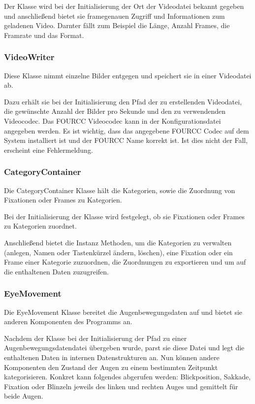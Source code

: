 \documentclass[a4paper,draft]{scrartcl}
\begin{document}
Der Klasse wird bei der Initialisierung der Ort der Videodatei bekannt gegeben und anschließend bietet sie framegenauen Zugriff und Informationen zum geladenen Video. Darnter fällt zum Beispiel die Länge, Anzahl Frames, die Framrate und das Format.

\subsubsection{VideoWriter}
Diese Klasse nimmt einzelne Bilder entgegen und speichert sie in einer Videodatei ab.

Dazu erhält sie bei der Initialisierung den Pfad der zu erstellenden Videodatei, die gewünschte Anzahl der Bilder pro Sekunde und den zu verwendenden Videocodec.
Das FOURCC Videocodec kann in der Konfigurationsdatei angegeben werden. Es ist wichtig, dass das angegebene FOURCC Codec auf dem System installiert ist und der FOURCC Name korrekt ist. Ist dies nicht der Fall, erscheint eine Fehlermeldung.

\subsubsection{CategoryContainer}
Die CategoryContainer Klasse hält die Kategorien, sowie die Zuordnung von Fixationen oder Frames zu Kategorien.

Bei der Initialisierung der Klasse wird festgelegt, ob sie Fixationen oder Frames zu Kategorien zuordnet.

Anschließend bietet die Instanz Methoden, um die Kategorien zu verwalten (anlegen, Namen oder Tastenkürzel ändern, löschen), eine Fixation oder ein Frame einer Kategorie zuzuordnen, die Zuordnungen zu exportieren und um auf die enthaltenen Daten zuzugreifen.

\subsubsection{EyeMovement}
Die EyeMovement Klasse bereitet die Augenbewegungsdaten auf und bietet sie anderen Komponenten des Programms an.

Nachdem der Klasse bei der Initialisierung der Pfad zu einer Augenbewegungsdatendatei übergeben wurde, parst sie diese Datei und legt die enthaltenen Daten in internen Datenstrukturen an. Nun können andere Komponenten den Zustand der Augen zu einem bestimmten Zeitpunkt kategorisieren. Konkret kann folgendes abgerufen werden: Blickposition, Sakkade, Fixation oder Blinzeln jeweils des linken und rechten Auges und gemittelt für beide Augen.
\end{document}
